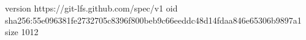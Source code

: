 version https://git-lfs.github.com/spec/v1
oid sha256:55e096381fe2732705c8396f800beb9c66eeddc48d14fdaa846e65306b9897a1
size 1012

